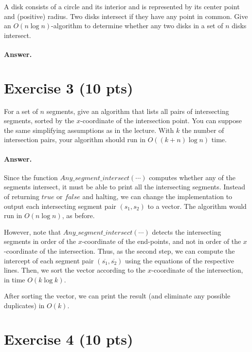 \documentclass[a4paper]{article}
\begin{document}
A disk consists of a circle and its interior and is represented by its center point and (positive) radius. Two disks intersect if they have any point in common. Give an $O(n \log n)$-algorithm to determine whether any two disks in a set of $n$ disks intersect.

\paragraph{Answer.}

\section*{Exercise 3 (10 pts)}

For a set of $n$ segments, give an algorithm that lists all pairs of intersecting segments, sorted by the $x$-coordinate of the intersection point. You can suppose the same simplifying assumptions as in the lecture. With $k$ the number of intersection pairs, your algorithm should run in $O((k + n) \log n)$ time.

\paragraph{Answer.}

Since the function ${Any\_segment\_intersect}(\cdots)$ computes whether any of the segments intersect, it must be able to print all the intersecting segments. Instead of returning ${true}$ or ${false}$ and halting, we can change the implementation to output each intersecting segment pair $(s_1, s_2)$ to a vector. The algorithm would run in $O(n \log n)$, as before.

However, note that ${Any\_segment\_intersect}(\cdots)$ detects the intersecting segments in order of the $x$-coordinate of the end-points, and not in order of the $x$-coordinate of the intersection. Thus, as the second step, we can compute the intercept of each segment pair $(\overline{s_1}, \overline{s_2})$ using the equations of the respective lines. Then, we sort the vector according to the $x$-coordinate of the intersection, in time $O(k \log k)$.

After sorting the vector, we can print the result (and eliminate any possible duplicates) in $O(k)$. 

\section*{Exercise 4 (10 pts)}
\end{document}
